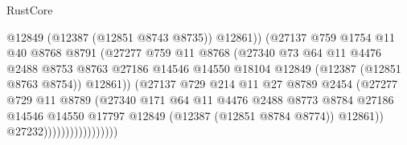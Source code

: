 \begin{lexlean}{RustCore}
\begin{coremodule}
                                      @12849
                                      (@12387 (@12851 @8743 @8735))
                                      @12861))
                                  (@27137
                                    @759
                                    @1754
                                    @11
                                    @40
                                    @8768
                                    @8791
                                    (@27277
                                      @759
                                      @11
                                      @8768
                                      (@27340
                                        @73
                                        @64
                                        @11
                                        @4476
                                        @2488
                                        @8753
                                        @8763
                                        @27186
                                        @14546
                                        @14550
                                        @18104
                                        @12849
                                        (@12387 (@12851 @8763 @8754))
                                        @12861))
                                    (@27137
                                      @729
                                      @214
                                      @11
                                      @27
                                      @8789
                                      @2454
                                      (@27277
                                        @729
                                        @11
                                        @8789
                                        (@27340
                                          @171
                                          @64
                                          @11
                                          @4476
                                          @2488
                                          @8773
                                          @8784
                                          @27186
                                          @14546
                                          @14550
                                          @17797
                                          @12849
                                          (@12387 (@12851 @8784 @8774))
                                          @12861))
                                      @27232)))))))))))))))))

\end{coremodule}
\end{lexlean}
